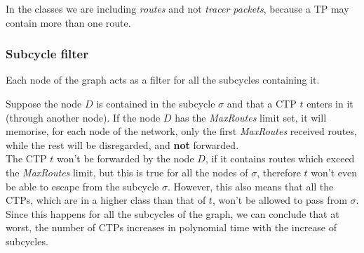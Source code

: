 \documentclass[a4paper]{article}
\begin{document}
In the classes we are including \emph{routes} and not \emph{tracer packets},
because a TP may contain more than one route.

\subsubsection{Subcycle filter}
Each node of the graph acts as a filter for all the subcycles containing it.

Suppose the node $D$ is contained in the subcycle $\sigma$ and that a CTP $t$
enters in it (through another node).
If the node $D$ has the \emph{MaxRoutes} limit set, it will memorise, for each
node of the network, only the first \emph{MaxRoutes} received routes, while the
rest will be disregarded, and \textbf{not} forwarded. \\
The CTP $t$ won't be forwarded by the node $D$, if it contains routes which
exceed the \emph{MaxRoutes} limit, but this is true for all the nodes of
$\sigma$, therefore $t$ won't even be able to escape from the subcycle
$\sigma$. However, this also means that all the CTPs, which are in a higher
class than that of $t$, won't be allowed to pass from $\sigma$.\\

Since this happens for all the subcycles of the graph, we can conclude that at
worst, the number of CTPs increases in polynomial time with the increase of
subcycles.
\end{document}
